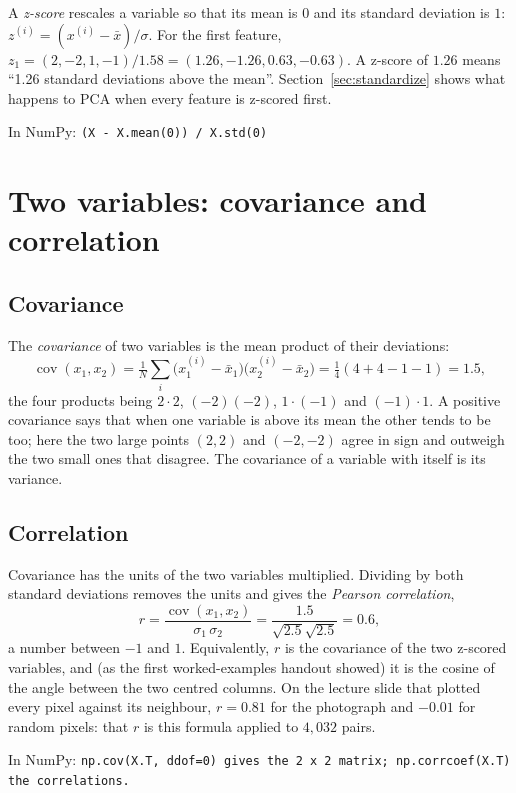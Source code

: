 \documentclass[11pt]{article}
\newcommand{\np}[1]{{\small\color{lightgray}In NumPy: \texttt{#1}}\par}
\begin{document}
A \emph{z-score} rescales a variable so that its mean is $0$ and its standard deviation
is $1$: $z^{(i)} = (x^{(i)} - \bar{x})/\sigma$. For the first feature,
$z_1 = (2, -2, 1, -1)/1.58 = (1.26, -1.26, 0.63, -0.63)$. A z-score of $1.26$ means ``1.26
standard deviations above the mean''. Section~\ref{sec:standardize} shows what happens to
PCA when every feature is z-scored first.

\np{(X - X.mean(0)) / X.std(0)}

\section{Two variables: covariance and correlation}

\subsection{Covariance}

The \emph{covariance} of two variables is the mean product of their deviations:
\[
\operatorname{cov}(x_1, x_2) = \tfrac{1}{N}\sum_{i}\big(x^{(i)}_1 - \bar{x}_1\big)\big(x^{(i)}_2 - \bar{x}_2\big)
= \tfrac{1}{4}(4 + 4 - 1 - 1) = 1.5 ,
\]
the four products being $2\cdot2$, $(-2)(-2)$, $1\cdot(-1)$ and $(-1)\cdot1$.
A positive covariance says that when one variable is above its mean the other tends to be
too; here the two large points $(2,2)$ and $(-2,-2)$ agree in sign and outweigh the two
small ones that disagree. The covariance of a variable with itself is its variance.

\subsection{Correlation}

Covariance has the units of the two variables multiplied. Dividing by both standard
deviations removes the units and gives the \emph{Pearson correlation},
\[
r = \frac{\operatorname{cov}(x_1, x_2)}{\sigma_1\,\sigma_2} = \frac{1.5}{\sqrt{2.5}\sqrt{2.5}} = 0.6,
\]
a number between $-1$ and $1$. Equivalently, $r$ is the covariance of the two z-scored
variables, and (as the first worked-examples handout showed) it is the cosine of the angle
between the two centred columns. On the lecture slide that plotted every pixel against its
neighbour, $r = 0.81$ for the photograph and $-0.01$ for random pixels: that $r$ is this
formula applied to $4{,}032$ pairs.

\np{np.cov(X.T, ddof=0) gives the 2 x 2 matrix; np.corrcoef(X.T) the correlations.}
\end{document}
